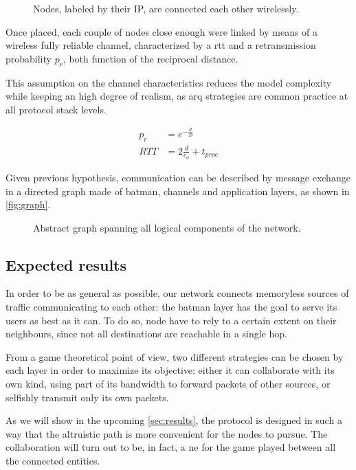 \documentclass[conference]{IEEEtran}
\begin{document}
\begin{figure}[h]
  \centering
  \caption{Nodes, labeled by their IP, are connected each other wirelessly.}
  \label{fig:nodes}
\end{figure}

Once placed, each couple of nodes close enough were linked by means of a
wireless fully reliable channel, characterized by a \gls{rtt} and a
retransmission probability $p_r$, both function of the reciprocal distance.

This assumption on the channel characteristics reduces the model complexity
while keeping an high degree of realism, as \gls{arq} strategies are common
practice at all protocol stack levels.

\begin{equation}
  \begin{split}
    p_r & = e^{-\frac{d}{D}} \\
    RTT &= 2 \frac{d}{c_0} + t_{proc}
  \end{split}
\end{equation}

Given previous hypothesis, communication can be described by message exchange in
a directed graph made of \gls{batman}, channels and application layers, as shown
in \autoref{fig:graph}.

\begin{figure}[h]
  \centering
  \caption{Abstract graph spanning all logical components of the network.}
  \label{fig:graph}
\end{figure}

\subsection{Expected results}

In order to be as general as possible, our network connects memoryless sources
of traffic communicating to each other: the \gls{batman} layer has the goal to
serve its users as best as it can. To do so, node have to rely to a certain
extent on their neighbours, since not all destinations are reachable in a single
hop.

From a game theoretical point of view, two different strategies can be chosen by
each layer in order to maximize its objective: either it can collaborate with
its own kind, using part of its bandwidth to forward packets of other sources,
or selfishly transmit only its own packets.

As we will show in the upcoming \autoref{sec:results}, the protocol is designed
in such a way that the altruistic path is more convenient for the nodes to
pursue. The collaboration will turn out to be, in fact, a \gls{ne} for the game
played between all the connected entities.
\end{document}
